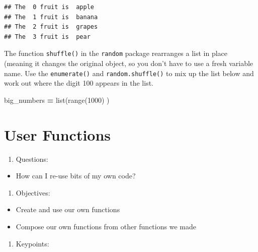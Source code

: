 \documentclass[]{book}
\newenvironment{Shaded}{\begin{snugshade}}{\end{snugshade}}
\newcommand{\BuiltInTok}[1]{#1}
\newcommand{\DecValTok}[1]{\textcolor[rgb]{0.00,0.00,0.81}{#1}}
\newcommand{\NormalTok}[1]{#1}
\newcommand{\OperatorTok}[1]{\textcolor[rgb]{0.81,0.36,0.00}{\textbf{#1}}}
\providecommand{\tightlist}{%
  \setlength{\itemsep}{0pt}\setlength{\parskip}{0pt}}
\theoremstyle{definition}
\theoremstyle{definition}
\theoremstyle{definition}
\theoremstyle{remark}
\begin{document}
\begin{verbatim}
## The  0 fruit is  apple
## The  1 fruit is  banana
## The  2 fruit is  grapes
## The  3 fruit is  pear
\end{verbatim}

The function \texttt{shuffle()} in the \texttt{random} package
rearranges a list in place (meaning it changes the original object, so
you don't have to use a fresh variable name. Use the
\texttt{enumerate()} and \texttt{random.shuffle()} to mix up the list
below and work out where the digit 100 appears in the list.

\begin{Shaded}
\begin{Highlighting}[]
\NormalTok{big_numbers }\OperatorTok{=} \BuiltInTok{list}\NormalTok{(}\BuiltInTok{range}\NormalTok{(}\DecValTok{1000}\NormalTok{) )}
\end{Highlighting}
\end{Shaded}

\hypertarget{user-functions}{%
\chapter{User Functions}\label{user-functions}}

\begin{enumerate}
\def\labelenumi{\arabic{enumi}.}
\tightlist
\item
  Questions:
\end{enumerate}

\begin{itemize}
\tightlist
\item
  How can I re-use bits of my own code?
\end{itemize}

\begin{enumerate}
\def\labelenumi{\arabic{enumi}.}
\setcounter{enumi}{1}
\tightlist
\item
  Objectives:
\end{enumerate}

\begin{itemize}
\tightlist
\item
  Create and use our own functions
\item
  Compose our own functions from other functions we made
\end{itemize}

\begin{enumerate}
\def\labelenumi{\arabic{enumi}.}
\setcounter{enumi}{2}
\tightlist
\item
  Keypoints:
\end{enumerate}
\end{document}

